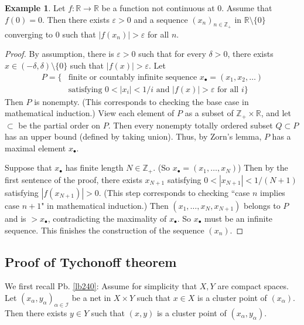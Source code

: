 \documentclass[12pt,b5paper,notitlepage]{article}
\theoremstyle{definition}
\newtheorem{eg}[df]{Example}
\theoremstyle{plain}
\newcommand{\scr}{\mathscr}
\newcommand{\blt}{\bullet}
\newcommand{\Zbb}{\mathbb Z}
\newcommand{\Rbb}{\mathbb R}
\newcommand{\eps}{\varepsilon}
\numberwithin{equation}{section}
\begin{document}
\begin{eg}
Let $f:\Rbb\rightarrow\Rbb$ be a function not continuous at $0$. Assume that $f(0)=0$.  Then there exists $\eps>0$ and a sequence $(x_n)_{n\in\Zbb_+}$ in $\Rbb\setminus\{0\}$ converging to $0$ such that $|f(x_n)|>\eps$ for all $n$.
\end{eg}



\begin{proof}
By assumption, there is $\eps>0$ such that for every $\delta>0$, there exists $x\in(-\delta,\delta)\setminus\{0\}$ such that $|f(x)|>\eps$. Let
\begin{align*}
P=\{&\text{finite or countably infinite sequence }x_\blt=(x_1,x_2,\dots)\\
&\text{satisfying }0<|x_i|<1/i\text{ and }|f(x)|>\eps\text{ for all }i\}
\end{align*}
Then $P$ is nonempty. (This corresponds to checking the base case in mathematical induction.) View each element of $P$ as a subset of $\Zbb_+\times\Rbb$, and let $\subset$ be the partial order on $P$. Then every nonempty totally ordered subset $Q\subset P$ has an upper bound (defined by taking union). Thus, by Zorn's lemma, $P$ has a maximal element $x_\blt$.

Suppose that $x_\blt$ has finite length $N\in\Zbb_+$. (So $x_\blt=(x_1,\dots,x_N)$) Then by the first sentence of the proof, there exists $x_{N+1}$ satisfying $0<|x_{N+1}|<1/(N+1)$ satisfying $|f(x_{N+1})|>0$. (This step corresponds to checking ``case $n$ implies case $n+1$" in mathematical induction.) Then $(x_1,\dots,x_N,x_{N+1})$ belongs to $P$ and is $>x_\blt$, contradicting the maximality of $x_\blt$. So $x_\blt$ must be an infinite sequence. This finishes the construction of the sequence $(x_n)$.
\end{proof}




\subsection{Proof of Tychonoff theorem}\label{lb503}





We first recall Pb. \ref{lb240}: Assume for simplicity that $X,Y$ are compact spaces. Let $(x_\alpha,y_\alpha)_{\alpha\in\scr I}$ be a net in $X\times Y$ such that $x\in X$ is a cluster point of $(x_\alpha)$. Then there exists $y\in Y$ such that $(x,y)$ is a cluster point of $(x_\alpha,y_\alpha)$.
\end{document}
